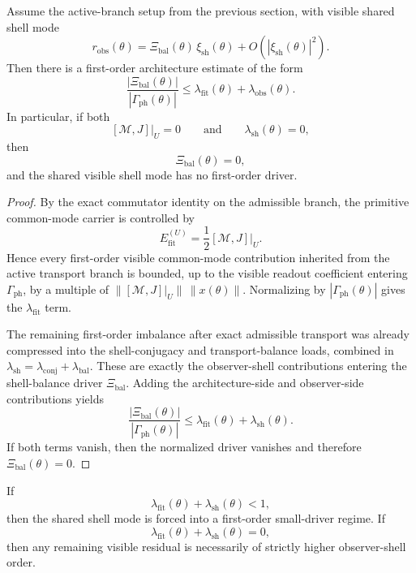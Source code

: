 \begin{theorem}
Assume the active-branch setup from the previous section, with visible shared shell mode
\[
  r_{\mathrm{obs}}(\theta)
  =
  \Xi_{\mathrm{bal}}(\theta)\,\xi_{\mathrm{sh}}(\theta)
  + O\!\left(|\xi_{\mathrm{sh}}(\theta)|^2\right).
\]
Then there is a first-order architecture estimate of the form
\[
  \frac{|\Xi_{\mathrm{bal}}(\theta)|}{|\Gamma_{\mathrm{ph}}(\theta)|}
  \le
  \lambda_{\mathrm{fit}}(\theta)+\lambda_{\mathrm{obs}}(\theta).
\]
In particular, if both
\[
  [\mathcal M,J]\big|_{U}=0
  \qquad\text{and}\qquad
  \lambda_{\mathrm{sh}}(\theta)=0,
\]
then
\[
  \Xi_{\mathrm{bal}}(\theta)=0,
\]
and the shared visible shell mode has no first-order driver.
\end{theorem}

\begin{proof}
By the exact commutator identity on the admissible branch, the primitive
common-mode carrier is controlled by
\[
  E_{\mathrm{fit}}^{(U)}
  = \frac12[\mathcal M,J]\big|_{U}.
\]
Hence every first-order visible common-mode contribution inherited from the
active transport branch is bounded, up to the visible readout coefficient
entering \(\Gamma_{\mathrm{ph}}\), by a multiple of
\(\|[\mathcal M,J]|_{U}\|\,\|x(\theta)\|\). Normalizing by
\(|\Gamma_{\mathrm{ph}}(\theta)|\) gives the \(\lambda_{\mathrm{fit}}\) term.

The remaining first-order imbalance after exact admissible transport was already compressed into the shell-conjugacy and transport-balance loads, combined in \(\lambda_{\mathrm{sh}}=\lambda_{\mathrm{conj}}+\lambda_{\mathrm{bal}}\). These are exactly the observer-shell contributions entering the shell-balance driver \(\Xi_{\mathrm{bal}}\). Adding the architecture-side and observer-side contributions yields
\[
  \frac{|\Xi_{\mathrm{bal}}(\theta)|}{|\Gamma_{\mathrm{ph}}(\theta)|}
  \le
  \lambda_{\mathrm{fit}}(\theta)+\lambda_{\mathrm{sh}}(\theta).
\]
If both terms vanish, then the normalized driver vanishes and therefore \(\Xi_{\mathrm{bal}}(\theta)=0\).
\end{proof}

\begin{corollary}
If
\[
  \lambda_{\mathrm{fit}}(\theta)+\lambda_{\mathrm{sh}}(\theta)<1,
\]
then the shared shell mode is forced into a first-order small-driver regime. If
\[
  \lambda_{\mathrm{fit}}(\theta)+\lambda_{\mathrm{sh}}(\theta)=0,
\]
then any remaining visible residual is necessarily of strictly higher observer-shell order.
\end{corollary}

